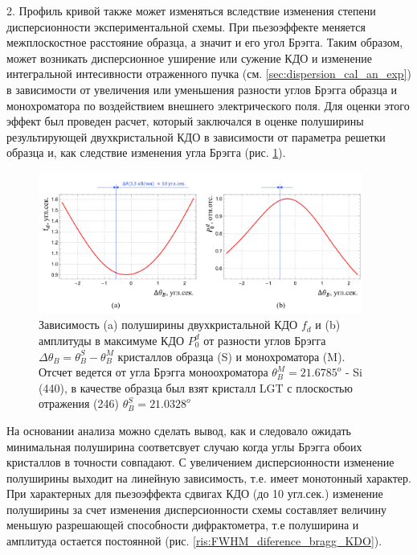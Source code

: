 2. Профиль кривой также может изменяться вследствие изменения степени
 дисперсионности экспериментальной схемы.
При пьезоэффекте меняется межплоскостное расстояние образца, а значит и его угол Брэгга.
Таким образом, может возникать дисперсионное уширение или сужение КДО и изменение интегральной интесивности
отраженного пучка (см. \ref{sec:dispersion_cal_an_exp}) в зависимости
от увеличения или уменьшения разности углов Брэгга образца и монохроматора
по воздействием внешнего электрического поля. Для оценки этого эффект был
проведен расчет, который заключался в оценке полуширины результирующей двухкристальной КДО
в зависимости от параметра решетки образца и, как следствие
 изменения угла Брэгга (рис. \ref{ris:FWHM_diference_bragg}).
\begin{figure}[H]
  \centering
  \includegraphics[width=0.95\textwidth]{images/delta_bragg_dispers.png}
  \caption{Зависимость (a) полуширины двухкристальной КДО $f_d$ и (b) амплитуды в максимуме КДО  $P^d_0$
   от разности углов Брэгга $\Delta\theta_B =\theta_B^S-\theta_B^M $ кристаллов
  образца (S) и монохроматора (M). Отсчет ведется от угла Брэгга моноохроматора $\theta_B^M = 21.6785 ^o$ - Si (440),
  в качестве образца был взят кристалл LGT с плоскостью отражения (246) $\theta_B^S = 21.0328 ^o$}
  \label{ris:FWHM_diference_bragg}
\end{figure}

На основании анализа можно сделать вывод, как и следовало ожидать минимальная полуширина соответсвует
случаю когда углы Брэгга обоих кристаллов в точности совпадают. С увеличением
дисперсионности изменение полуширины выходит на линейную зависимость, т.е.
имеет монотонный характер. При характерных для пьезоэффекта сдвигах КДО (до 10 угл.сек.)
изменение полуширины за счет изменения дисперсионности схемы составляет
величину меньшую разрешающей способности дифрактометра, т.е полуширина и
амплитуда остается постоянной
 (рис. \ref{ris:FWHM_diference_bragg_KDO}).


